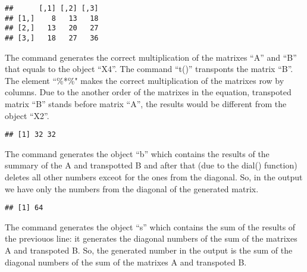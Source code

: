 \documentclass[12pt,]{article}
\newenvironment{Shaded}{\begin{snugshade}}{\end{snugshade}}
\newcommand{\KeywordTok}[1]{\textcolor[rgb]{0.13,0.29,0.53}{\textbf{#1}}}
\newcommand{\OperatorTok}[1]{\textcolor[rgb]{0.81,0.36,0.00}{\textbf{#1}}}
\newcommand{\NormalTok}[1]{#1}
\begin{document}
\begin{Shaded}
\end{Shaded}

\begin{verbatim}
##      [,1] [,2] [,3]
## [1,]    8   13   18
## [2,]   13   20   27
## [3,]   18   27   36
\end{verbatim}

The command generates the correct multiplication of the matrixes ``A''
and ``B'' that equals to the object ``X4''. The command ``t()''
transponts the matrix ``B''. The element ``\%*\%" makes the correct
multiplication of the matrixes row by columns. Due to the another order
of the matrixes in the equation, transpoted matrix ``B'' stands before
matrix ``A'', the results would be different from the object ``X2''.

\begin{Shaded}
\end{Shaded}

\begin{verbatim}
## [1] 32 32
\end{verbatim}

The command generates the object ``b'' which contains the results of the
summary of the A and transpotted B and after that (due to the dial()
function) deletes all other numbers exceot for the ones from the
diagonal. So, in the output we have only the numbers from the diagonal
of the generated matrix.

\begin{Shaded}
\end{Shaded}

\begin{verbatim}
## [1] 64
\end{verbatim}

The command generates the object ``s'' which contains the sum of the
results of the previouos line: it generates the diagonal numbers of the
sum of the matrixes A and transpoted B. So, the generated number in the
output is the sum of the diagonal numbers of the sum of the matrixes A
and transpoted B.
\end{document}
